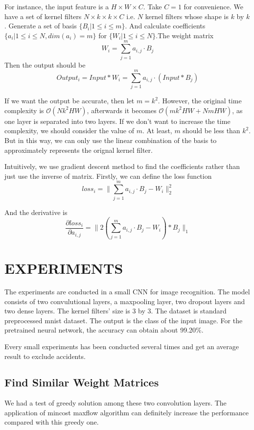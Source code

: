 \documentclass[letterpaper, 10 pt, conference]{ieeeconf}  %
\begin{document}
For instance, the input feature is a $H \times W \times C$. Take $C = 1$ for convenience. We have a set of kernel filters $N \times k \times k \times C$ i.e. $N$ kernel filters whose shape is $k$ by $k$. Generate a set of basis $\{B_i | 1 \leq i \leq m\}$. And calculate coefficients $\{a_i | 1 \leq i \leq N, dim(a_i) = m\}$ for $\{W_i| 1 \leq i \leq N\}. $The weight matrix 
$$W_i = \sum\limits_{j=1}^m a_{i,j} \cdot B_j$$
Then the output should be 
$$
Output_i = Input * W_i  =  \sum\limits_{j=1}^m a_{i,j} \cdot (Input *  B_j)
$$

If we want the output be accurate, then let $m = k^2$. However, the original time complexity is $\mathcal{O}(Nk^2HW)$, afterwards it becomes $\mathcal{O}(mk^2HW+NmHW)$, as one layer is separated into two layers. If we don't want to increase the time complexity, we should consider the value of $m$. At least, $m$ should be less than $k^2$. But in this way, we can only use the linear combination of the basis to approximately represents the orignal kernel filter. 

Intuitively, we use gradient descent method to find the coefficients rather than just use the inverse of matrix. Firstly, we can define the loss function
$$
loss_i = \lVert \sum\limits_{j=1}^m a_{i,j} \cdot B_j - W_i \rVert_2^2
$$

And the derivative is 
$$
\frac{\partial loss_i}{\partial a_{i,j}} = \lVert 2 (\sum\limits_{j=1}^m a_{i,j} \cdot B_j - W_i) * B_j \rVert_1
$$

\section{EXPERIMENTS}

The experiments are conducted in a small CNN for image recognition. The model consists of two convulutional layers, a maxpooling layer, two dropout layers and two dense layers. The kernel filters' size is 3 by 3. The dataset is standard preprocessed mnist dataset. The output is the class of the input image. For the pretrained neural network, the accuracy can obtain about 99.20\%.

Every small experiments has been conducted several times and get an average result to exclude accidents.

\subsection{Find Similar Weight Matrices}
We had a test of greedy solution among these two convolution layers. The application of mincost maxflow algorithm can definitely increase the performance compared with this greedy one. 
\end{document}
